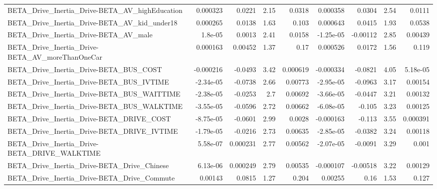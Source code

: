 \begin{tabular}{lrrrrrrrr}
BETA\_Drive\_Inertia\_Drive-BETA\_AV\_highEducation     &    0.000323 &       0.0221 &     2.15 &   0.0318 &   0.000358 &      0.0304 &         2.54 &        0.0111 \\
BETA\_Drive\_Inertia\_Drive-BETA\_AV\_kid\_under18       &    0.000265 &       0.0138 &     1.63 &    0.103 &   0.000643 &      0.0415 &         1.93 &        0.0538 \\
BETA\_Drive\_Inertia\_Drive-BETA\_AV\_male              &     1.8e-05 &       0.0013 &     2.41 &   0.0158 &  -1.25e-05 &    -0.00112 &         2.85 &       0.00439 \\
BETA\_Drive\_Inertia\_Drive-BETA\_AV\_moreThanOneCar    &    0.000163 &      0.00452 &     1.37 &     0.17 &   0.000526 &      0.0172 &         1.56 &         0.119 \\
BETA\_Drive\_Inertia\_Drive-BETA\_BUS\_COST             &   -0.000216 &      -0.0493 &     3.42 & 0.000619 &  -0.000334 &     -0.0821 &         4.05 &      5.18e-05 \\
BETA\_Drive\_Inertia\_Drive-BETA\_BUS\_IVTIME           &   -2.34e-05 &      -0.0738 &     2.66 &  0.00773 &  -2.95e-05 &     -0.0963 &         3.17 &       0.00154 \\
BETA\_Drive\_Inertia\_Drive-BETA\_BUS\_WAITTIME         &   -2.38e-05 &      -0.0253 &      2.7 &  0.00692 &  -3.66e-05 &     -0.0447 &         3.21 &       0.00132 \\
BETA\_Drive\_Inertia\_Drive-BETA\_BUS\_WALKTIME         &   -3.55e-05 &      -0.0596 &     2.72 &  0.00662 &  -6.08e-05 &      -0.105 &         3.23 &       0.00125 \\
BETA\_Drive\_Inertia\_Drive-BETA\_DRIVE\_COST           &   -8.75e-05 &      -0.0601 &     2.99 &   0.0028 &  -0.000163 &      -0.113 &         3.55 &      0.000391 \\
BETA\_Drive\_Inertia\_Drive-BETA\_DRIVE\_IVTIME         &   -1.79e-05 &      -0.0216 &     2.73 &  0.00635 &  -2.85e-05 &     -0.0382 &         3.24 &       0.00118 \\
BETA\_Drive\_Inertia\_Drive-BETA\_DRIVE\_WALKTIME       &    5.58e-07 &     0.000231 &     2.77 &  0.00562 &  -2.07e-05 &     -0.0091 &         3.29 &         0.001 \\
BETA\_Drive\_Inertia\_Drive-BETA\_Drive\_Chinese        &    6.13e-06 &     0.000249 &     2.79 &  0.00535 &  -0.000107 &    -0.00518 &         3.22 &       0.00129 \\
BETA\_Drive\_Inertia\_Drive-BETA\_Drive\_Commute        &     0.00143 &       0.0815 &     1.27 &    0.204 &    0.00255 &        0.16 &         1.53 &         0.127 \\

\end{tabular}
